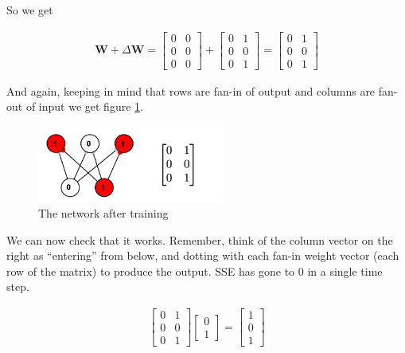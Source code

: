 So we get

\begin{align*}
\mathbf{W} + \Delta \mathbf{W}  =
\begin{bmatrix} 0 & 0 \\ 0 & 0 \\  0  & 0  \end{bmatrix} +
\begin{bmatrix} 0 & 1 \\ 0 & 0 \\  0  & 1  \end{bmatrix} =
\begin{bmatrix} 0 & 1 \\ 0 & 0 \\  0  & 1  \end{bmatrix}
\end{align*}

And again, keeping in mind that rows are fan-in of output and columns are fan-out of input we get figure \ref{lms_vector_2}.

\begin{figure}[h]
\centering
\includegraphics[width=0.55\textwidth]{images/vectorLMSAfterTrain.png}
\caption[Jeff Yoshimi.]{The network after training}
\label{lms_vector_2}
\end{figure}

We can now check that it works. Remember, think of the column vector on the right as ``entering'' from below, and dotting with each fan-in weight vector (each row of the matrix) to produce the output. SSE has gone to 0 in a single time step.

\begin{align*}
\begin{bmatrix} 0 & 1 \\ 0 & 0 \\  0  & 1  \end{bmatrix}
\begin{bmatrix} 0 \\ 1 \end{bmatrix}
= \begin{bmatrix} 1 \\ 0 \\ 1  \end{bmatrix}
\end{align*}

